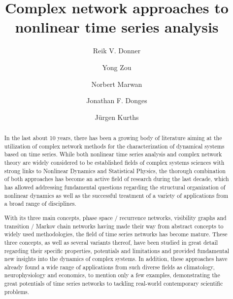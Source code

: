 \documentclass[3p,sort&compress]{elsarticle}
\begin{document}
\begin{frontmatter}

\title{Complex network approaches to nonlinear time series analysis}

\author[PIK]{Reik V. Donner}
\address[PIK]{Potsdam Institute for Climate Impact Research, P.\,O.~Box
60\,12\,03, 14412 Potsdam, Germany}

\author[ECNU]{Yong Zou}
\address[ECNU]{Department of Physics, East China Normal University, Shanghai 200062, China}

\author[PIK]{Norbert Marwan}

\author[PIK]{Jonathan F. Donges}

\author[PIK,UK,HU,RU1,RU2]{J\"urgen Kurths}
 \address[UK]{Institute for Complex Systems and Mathematical Biology, University
 of Aberdeen, Aberdeen AB243UE, United Kingdom}
 \address[HU]{Department of Physics, Humboldt University Berlin,
 Newtonstra{\ss}e 15, 12489 Berlin, Germany}
\address[RU1]{Department of Control Theory, Nizhny Novgorod State University,
Gagarin Avenue 23, 606950 Nizhny Novgorod, Russia} 
\address[RU2]{Institute of Applied Physics of the Russian Academy of Sciences,
603950 Nizhny Novgorod, Russia}


\begin{abstract}

In the last about 10 years, there has been a growing body of literature aiming
at the utilization of complex network methods for the characterization of
dynamical systems based on time series. While both nonlinear time series
analysis and complex network theory are widely considered to be established
fields of complex systems sciences with strong links to Nonlinear Dynamics and
Statistical Physics, the thorough combination of both approaches has become an
active field of research during the last decade, which has allowed addressing
fundamental questions regarding the structural organization of nonlinear
dynamics as well as the successful treatment of a variety of applications from a
broad range of disciplines.

With its three main concepts, phase space / recurrence networks, visibility
graphs and transition / Markov chain networks having made their way from
abstract concepts to widely used methodologies, the field of time series
networks has become mature. These three concepts, as well as several variants
thereof, have been studied in great detail regarding their specific properties,
potentials and limitations and provided fundamental new insights into the
dynamics of complex systems. In addition, these approaches have already found a
wide range of applications from such diverse fields as climatology,
neurophysiology and economics, to mention only a few examples, demonstrating the
great potentials of time series networks to tackling real-world contemporary
scientific problems.


\end{abstract}
\end{frontmatter}
\end{document}
